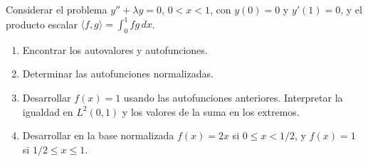 Considerar el problema \(y''+\lambda y=0\), \(0<x<1\),
con \(y(0)=0\) y \(y'(1)=0\), y el producto escalar \(\langle f,g\rangle=\int_0^1fg\,dx\).

\begin{enumerate}[label=(\alph*),ref=\alph*,leftmargin=*]
\item Encontrar los autovalores y autofunciones.
\item Determinar las autofunciones normalizadas.
\item Desarrollar \(f(x)=1\) usando las autofunciones anteriores. Interpretar la igualdad en \(L^2(0,1)\) y los valores de la suma en los extremos.
\item Desarrollar en la base normalizada \(f(x)=2x\) si \(0\le x<1/2\), y \(f(x)=1\) si \(1/2\le x\le1\).
\end{enumerate}
